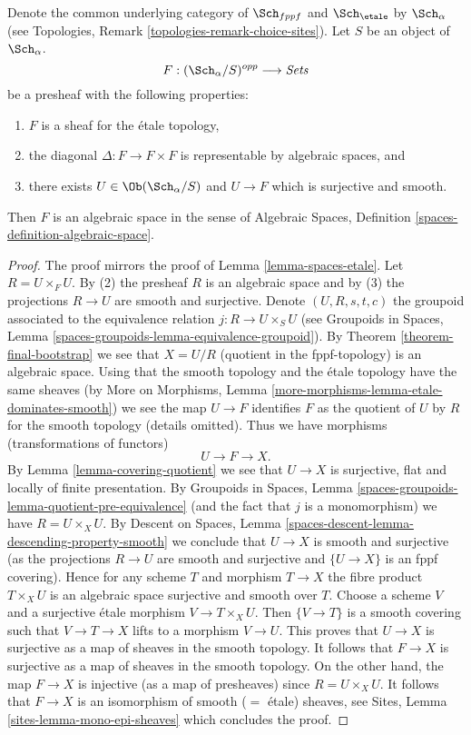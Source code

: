 \begin{lemma}
\label{lemma-spaces-etale-smooth-cover}
Denote the common underlying category of $\Sch_{fppf}$
and $\Sch_\etale$ by $\Sch_\alpha$ (see
Topologies, Remark \ref{topologies-remark-choice-sites}). Let $S$ be an object
of $\Sch_\alpha$. 
$$
F : (\Sch_\alpha/S)^{opp} \longrightarrow \textit{Sets}
$$
be a presheaf with the following properties:
\begin{enumerate}
\item $F$ is a sheaf for the \'etale topology,
\item the diagonal $\Delta : F \to F \times F$ is representable
by algebraic spaces, and
\item there exists $U \in \Ob(\Sch_\alpha/S)$
and $U \to F$ which is surjective and smooth.
\end{enumerate}
Then $F$ is an algebraic space in the sense of
Algebraic Spaces, Definition \ref{spaces-definition-algebraic-space}.
\end{lemma}

\begin{proof}
The proof mirrors the proof of Lemma \ref{lemma-spaces-etale}. Let
$R = U \times_F U$. By (2) the presheaf $R$ is an algebraic space and by (3)
the projections $R \to U$ are smooth and surjective. Denote $(U, R, s, t, c)$
the groupoid associated to the equivalence relation $j : R \to U \times_S U$
(see Groupoids in Spaces, Lemma
\ref{spaces-groupoids-lemma-equivalence-groupoid}).
By Theorem \ref{theorem-final-bootstrap} we see that $X = U/R$ (quotient
in the fppf-topology) is an algebraic space. Using that the smooth
topology and the \'etale topology have the same sheaves (by
More on Morphisms, Lemma \ref{more-morphisms-lemma-etale-dominates-smooth})
we see the map $U \to F$ identifies $F$ as the quotient of
$U$ by $R$ for the smooth topology (details omitted).
Thus we have morphisms (transformations of functors)
$$
U \to F \to X.
$$
By Lemma \ref{lemma-covering-quotient} we see that $U \to X$ is
surjective, flat and locally of finite presentation. By
Groupoids in Spaces, Lemma
\ref{spaces-groupoids-lemma-quotient-pre-equivalence}
(and the fact that $j$ is a monomorphism) we have $R = U \times_X U$. By
Descent on Spaces, Lemma \ref{spaces-descent-lemma-descending-property-smooth}
we conclude that $U \to X$ is smooth and surjective (as the projections
$R \to U$ are smooth and surjective and $\{U \to X\}$ is an fppf
covering). Hence for any scheme $T$ and morphism $T \to X$ the fibre product
$T \times_X U$ is an algebraic space surjective and smooth over $T$.
Choose a scheme $V$ and a surjective \'etale morphism $V \to T \times_X U$.
Then $\{V \to T\}$ is a smooth covering such that $V \to T \to X$
lifts to a morphism $V \to U$. This proves that
$U \to X$ is surjective as a map of sheaves in the smooth topology.
It follows that $F \to X$ is surjective as a map of sheaves in the smooth
topology. On the other hand, the map $F \to X$ is injective (as a map
of presheaves) since $R = U \times_X U$.
It follows that $F \to X$ is an isomorphism of smooth ($=$ \'etale)
sheaves, see Sites, Lemma \ref{sites-lemma-mono-epi-sheaves}
which concludes the proof.
\end{proof}

